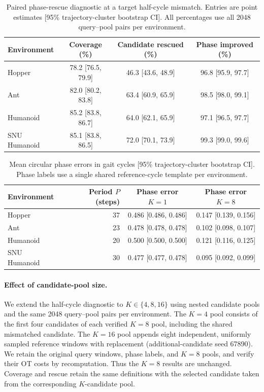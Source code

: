 \begin{table}[H]
\centering\small
\setlength{\tabcolsep}{0.35em}
\begin{tabular}{lccc}
\toprule
Environment & Coverage (\%) & Candidate rescued (\%) & Phase improved (\%) \\
\midrule
Hopper & 78.2 [76.5, 79.9] & 46.3 [43.6, 48.9] & 96.8 [95.9, 97.7] \\
Ant & 82.0 [80.2, 83.8] & 63.4 [60.9, 65.9] & 98.5 [98.0, 99.1] \\
Humanoid & 85.2 [83.8, 86.7] & 64.0 [62.1, 65.9] & 97.1 [96.5, 97.7] \\
SNU Humanoid & 85.1 [83.8, 86.5] & 72.0 [70.1, 73.9] & 99.3 [99.0, 99.6] \\
\bottomrule
\end{tabular}
\caption{Paired phase-rescue diagnostic at a target half-cycle mismatch.
Entries are point estimates [95\% trajectory-cluster bootstrap CI].
All percentages use all 2048 query--pool pairs per environment.}
\label{tab:phase_rescue}
\end{table}
\begin{table}[H]
\centering\small
\begin{tabular}{lrcc}
\toprule
Environment & Period $P$ (steps) & Phase error $K=1$ & Phase error $K=8$ \\
\midrule
Hopper & 37 & 0.486 [0.486, 0.486] & 0.147 [0.139, 0.156] \\
Ant & 23 & 0.478 [0.478, 0.478] & 0.102 [0.098, 0.107] \\
Humanoid & 20 & 0.500 [0.500, 0.500] & 0.121 [0.116, 0.125] \\
SNU Humanoid & 30 & 0.477 [0.477, 0.478] & 0.095 [0.092, 0.099] \\
\bottomrule
\end{tabular}
\caption{Mean circular phase errors in gait cycles [95\% trajectory-cluster
bootstrap CI]. Phase labels use a single shared reference-cycle template
per environment.}
\label{tab:phase_rescue_errors}
\end{table}


\paragraph{Effect of candidate-pool size.}
We extend the half-cycle diagnostic to $K\in\{4,8,16\}$ using nested
candidate pools and the same 2048 query--pool pairs per environment.
The $K=4$ pool consists of the first four candidates of each verified
$K=8$ pool, including the shared mismatched candidate. The $K=16$ pool
appends eight independent, uniformly sampled reference windows with
replacement (additional-candidate seed 67890). We retain the original
query windows, phase labels, and $K=8$ pools, and verify their OT costs
by recomputation. Thus the $K=8$ results are unchanged.
Coverage and rescue retain the same definitions with the selected
candidate taken from the corresponding $K$-candidate pool.

